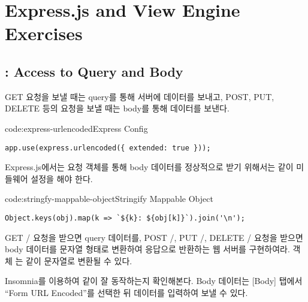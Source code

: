 \section{Express.js and View Engine Exercises}\label{sect:express-js-and-view-engine-exercises}

\subsection*{: Access to Query and Body}

GET 요청을 보낼 때는 query를 통해 서버에 데이터를 보내고, POST, PUT, DELETE 등의 요청을 보낼 때는 body를 통해 데이터를 보낸다.

\begin{codeenv}{code:express-urlencoded}{Express  Config}\begin{verbatim}
app.use(express.urlencoded({ extended: true }));
\end{verbatim}
\end{codeenv}

Express.js에서는 요청 객체를 통해 body 데이터를 정상적으로 받기 위해서는 \와 같이 미들웨어 설정을 해야 한다.

\begin{codeenv}{code:stringfy-mappable-object}{Stringify Mappable Object}\begin{verbatim}
Object.keys(obj).map(k => `${k}: ${obj[k]}`).join('\n');
\end{verbatim}
\end{codeenv}

GET / 요청을 받으면 query 데이터를, POST /, PUT /, DELETE / 요청을 받으면 body 데이터를 문자열 형태로 변환하여 응답으로 반환하는 웹 서버를 구현하여라. 객체 는 \와 같이 문자열로 변환될 수 있다.


Insomnia를 이용하여 \와 같이 잘 동작하는지 확인해본다. Body 데이터는 [Body] 탭에서 ``Form URL Encoded''를 선택한 뒤 데이터를 입력하여 보낼 수 있다.
\newpage

